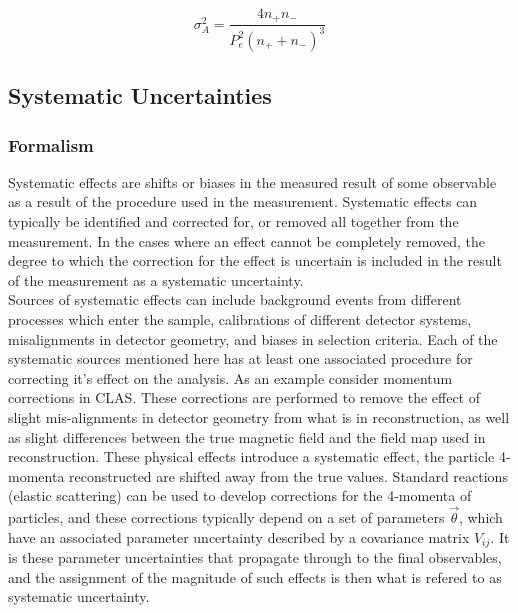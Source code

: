 \begin{equation}
  \sigma_{A}^{2} = \frac{4n_+ n_-}{P_{e}^{2} (n_+ + n_-)^3}
\end{equation}



\subsection*{Systematic Uncertainties}
\subsubsection*{Formalism}
Systematic effects are shifts or biases in the measured result of some observable as a result of the procedure used in the measurement.  Systematic effects can typically be identified and corrected for, or removed all together from the measurement.  In the cases where an effect cannot be completely removed, the degree to which the correction for the effect is uncertain is included in the result of the measurement as a systematic uncertainty. \\

Sources of systematic effects can include background events from different processes which enter the sample, calibrations of different detector systems, misalignments in detector geometry, and biases in selection criteria.  Each of the systematic sources mentioned here has at least one associated procedure for correcting it's effect on the analysis.  As an example consider momentum corrections in CLAS.  These corrections are performed to remove the effect of slight mis-alignments in detector geometry from what is in reconstruction, as well as slight differences between the true magnetic field and the field map used in reconstruction.  These physical effects introduce a systematic effect, the particle 4-momenta reconstructed are shifted away from the true values.  Standard reactions (elastic scattering) can be used to develop corrections for the 4-momenta of particles, and these corrections typically depend on a set of parameters $\vec{\theta}$, which have an associated parameter uncertainty described by a covariance matrix $V_{ij}$.  It is these parameter uncertainties that propagate through to the final observables, and the assignment of the magnitude of such effects is then what is refered to as systematic uncertainty. \\

